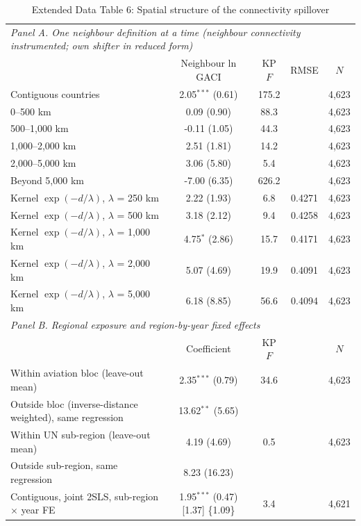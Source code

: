 \documentclass[12pt]{article}
\begin{document}
\begin{table}[htbp]
\centering
\begin{threeparttable}
\caption{Extended Data Table 6: Spatial structure of the connectivity spillover}
\label{tab:spill_ext}
\scriptsize
\begin{tabular}{lcccc}
\toprule
\multicolumn{5}{l}{\textit{Panel A. One neighbour definition at a time (neighbour connectivity instrumented; own shifter in reduced form)}} \\
 & Neighbour ln GACI & KP $F$ & RMSE & $N$ \\
\midrule
  Contiguous countries & 2.05$^{***}$ (0.61) & 175.2 & & 4,623 \\
  0--500 km & 0.09 (0.90) & 88.3 & & 4,623 \\
  500--1,000 km & -0.11 (1.05) & 44.3 & & 4,623 \\
  1,000--2,000 km & 2.51 (1.81) & 14.2 & & 4,623 \\
  2,000--5,000 km & 3.06 (5.80) & 5.4 & & 4,623 \\
  Beyond 5,000 km & -7.00 (6.35) & 626.2 & & 4,623 \\
  Kernel $\exp(-d/\lambda)$, $\lambda$ = 250 km & 2.22 (1.93) & 6.8 & 0.4271 & 4,623 \\
  Kernel $\exp(-d/\lambda)$, $\lambda$ = 500 km & 3.18 (2.12) & 9.4 & 0.4258 & 4,623 \\
  Kernel $\exp(-d/\lambda)$, $\lambda$ = 1,000 km & 4.75$^{*}$ (2.86) & 15.7 & 0.4171 & 4,623 \\
  Kernel $\exp(-d/\lambda)$, $\lambda$ = 2,000 km & 5.07 (4.69) & 19.9 & 0.4091 & 4,623 \\
  Kernel $\exp(-d/\lambda)$, $\lambda$ = 5,000 km & 6.18 (8.85) & 56.6 & 0.4094 & 4,623 \\
\midrule
\multicolumn{5}{l}{\textit{Panel B. Regional exposure and region-by-year fixed effects}} \\
 & Coefficient & KP $F$ & & $N$ \\
  Within aviation bloc (leave-out mean) & 2.35$^{***}$ (0.79) & 34.6 & & 4,623 \\
  Outside bloc (inverse-distance weighted), same regression & 13.62$^{**}$ (5.65) & & & \\
  Within UN sub-region (leave-out mean) & 4.19 (4.69) & 0.5 & & 4,623 \\
  Outside sub-region, same regression & 8.23 (16.23) & & & \\
  Contiguous, joint 2SLS, sub-region $\times$ year FE & 1.95$^{***}$ (0.47) [1.37] \{1.09\} & 3.4 & & 4,621 \\

\end{tabular}
\end{threeparttable}
\end{table}
\end{document}
